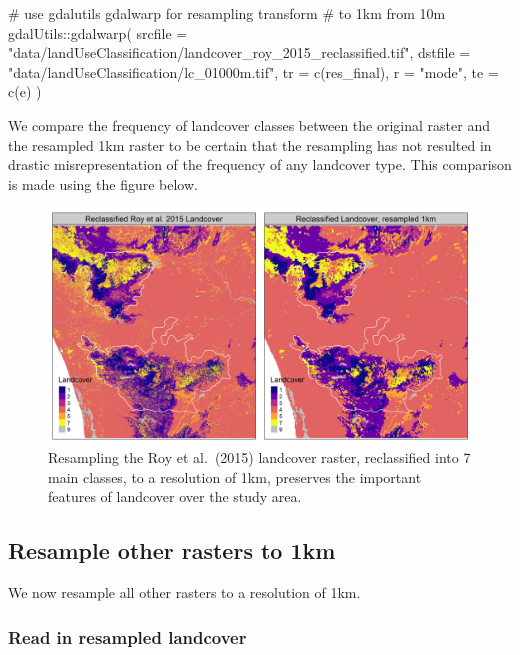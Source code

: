 \documentclass[
]{article}
\newenvironment{Shaded}{}{}
\newcommand{\CommentTok}[1]{\textcolor[rgb]{0.00,0.50,0.00}{#1}}
\newcommand{\DataTypeTok}[1]{#1}
\newcommand{\KeywordTok}[1]{\textcolor[rgb]{0.00,0.00,1.00}{#1}}
\newcommand{\NormalTok}[1]{#1}
\newcommand{\OperatorTok}[1]{#1}
\newcommand{\StringTok}[1]{\textcolor[rgb]{0.00,0.50,0.50}{#1}}
\begin{document}
\begin{Shaded}
\begin{Highlighting}[]
\CommentTok{# use gdalutils gdalwarp for resampling transform}
\CommentTok{# to 1km from 10m}
\NormalTok{gdalUtils}\OperatorTok{::}\KeywordTok{gdalwarp}\NormalTok{(}
  \DataTypeTok{srcfile =} \StringTok{"data/landUseClassification/landcover_roy_2015_reclassified.tif"}\NormalTok{,}
  \DataTypeTok{dstfile =} \StringTok{"data/landUseClassification/lc_01000m.tif"}\NormalTok{,}
  \DataTypeTok{tr =} \KeywordTok{c}\NormalTok{(res_final), }\DataTypeTok{r =} \StringTok{"mode"}\NormalTok{, }\DataTypeTok{te =} \KeywordTok{c}\NormalTok{(e)}
\NormalTok{)}
\end{Highlighting}
\end{Shaded}

We compare the frequency of landcover classes between the original raster and the resampled 1km raster to be certain that the resampling has not resulted in drastic misrepresentation of the frequency of any landcover type. This comparison is made using the figure below.

\begin{figure}
\centering
\includegraphics{figs/fig_landcover_resample.png}
\caption{Resampling the Roy et al.~(2015) landcover raster, reclassified into 7 main classes, to a resolution of 1km, preserves the important features of landcover over the study area.}
\end{figure}

\hypertarget{resample-other-rasters-to-1km}{%
\subsection{Resample other rasters to 1km}\label{resample-other-rasters-to-1km}}

We now resample all other rasters to a resolution of 1km.

\hypertarget{read-in-resampled-landcover}{%
\subsubsection{Read in resampled landcover}\label{read-in-resampled-landcover}}
\end{document}
